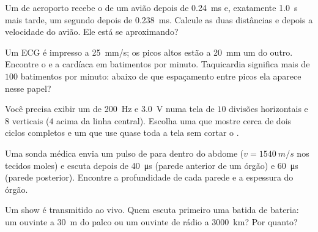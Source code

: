 \begin{exercise}[$\star\star$]\label{exo:g10:signals-and-waves:7}
Um  de aeroporto recebe o  de um avião depois de \qty{0.24}{ms}
e, exatamente \qty{1.0}{s} mais tarde, um segundo  depois de
\qty{0.238}{ms}. Calcule as duas distâncias e depois a velocidade do
avião. Ele está se aproximando?
\end{exercise}

\begin{exercise}[$\star\star$]\label{exo:g10:signals-and-waves:8}
Um ECG é impresso a \qty{25}{mm/s}; os picos altos estão a \qty{20}{mm}
um do outro. Encontre o  e a  cardíaca em batimentos por
minuto. Taquicardia significa mais de $100$ batimentos por minuto: abaixo
de que espaçamento entre picos ela aparece nesse papel?
\end{exercise}

\begin{exercise}[$\star\star$]\label{exo:g10:signals-and-waves:9}
Você precisa exibir um  de \qty{200}{Hz} e  \qty{3.0}{V}
numa tela de $10$ divisões horizontais e $8$ verticais ($4$ acima da
linha central). Escolha uma  que mostre cerca de dois ciclos
completos e um  que use quase toda a tela sem cortar o .
\end{exercise}

\begin{exercise}[$\star\star$]\label{exo:g10:signals-and-waves:10}
Uma sonda médica envia um pulso de  para dentro do abdome
($v = \qty{1540}{m/s}$ nos tecidos moles) e escuta  depois de
\qty{40}{\micro s} (parede anterior de um órgão) e \qty{60}{\micro s}
(parede posterior). Encontre a profundidade de cada parede e a espessura
do órgão.
\end{exercise}

\begin{exercise}[$\star\star$]\label{exo:g10:signals-and-waves:11}
Um show é transmitido ao vivo. Quem escuta primeiro uma batida de
bateria: um ouvinte a \qty{30}{m} do palco ou um ouvinte de rádio a
\qty{3000}{km}? Por quanto?
\end{exercise}


